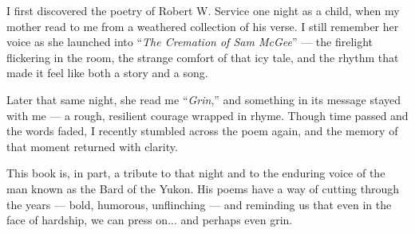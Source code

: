 \vspace{1em}

I first discovered the poetry of Robert W. Service one night as a child, when my mother read to me from a weathered collection of his verse. I still remember her voice as she launched into “\textit{The Cremation of Sam McGee}” — the firelight flickering in the room, the strange comfort of that icy tale, and the rhythm that made it feel like both a story and a song.

Later that same night, she read me “\textit{Grin},” and something in its message stayed with me — a rough, resilient courage wrapped in rhyme. Though time passed and the words faded, I recently stumbled across the poem again, and the memory of that moment returned with clarity.

This book is, in part, a tribute to that night and to the enduring voice of the man known as the Bard of the Yukon. His poems have a way of cutting through the years — bold, humorous, unflinching — and reminding us that even in the face of hardship, we can press on... and perhaps even grin.

